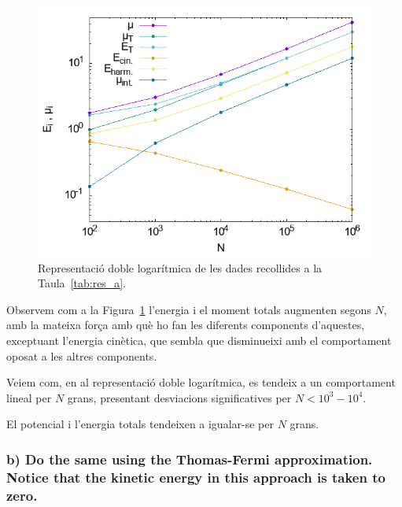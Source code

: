 \documentclass[a4paper]{article}
\begin{document}
\begin{figure}[H]
    \centering
    \includegraphics[scale=0.55]{../a.png}
\caption{Representació doble logarítmica de les dades recollides a la Taula~\ref{tab:res_a}.}
\label{fig:res_a}
\end{figure}

Observem com a la Figura~\ref{fig:res_a} l'energia i el moment totals augmenten segons $N$, amb la mateixa força amb què ho fan les diferents components d'aquestes, exceptuant l'energia cinètica, que sembla que disminueixi amb el comportament oposat a les altres components.

Veiem com, en al representació doble logarítmica, es tendeix a un comportament lineal per $N$ grans, presentant desviacions significatives per $N < 10^3-10^4$.

El potencial i l'energia totals tendeixen a igualar-se per $N$ grans.


\subsubsection*{b) Do the same using the Thomas-Fermi approximation. Notice that the kinetic energy in this approach is taken to zero.}
\end{document}
